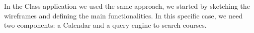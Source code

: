 \documentclass[]{usiinfbachelorproject}
\begin{document}
In the Class application we used the same approach, we started by sketching the wireframes and defining the main functionalities. In this specific case, we need two components: a Calendar and a query engine to search courses. 
\begin{figure}[H]
  \centering
  \hfill
\end{figure}
\end{document}

